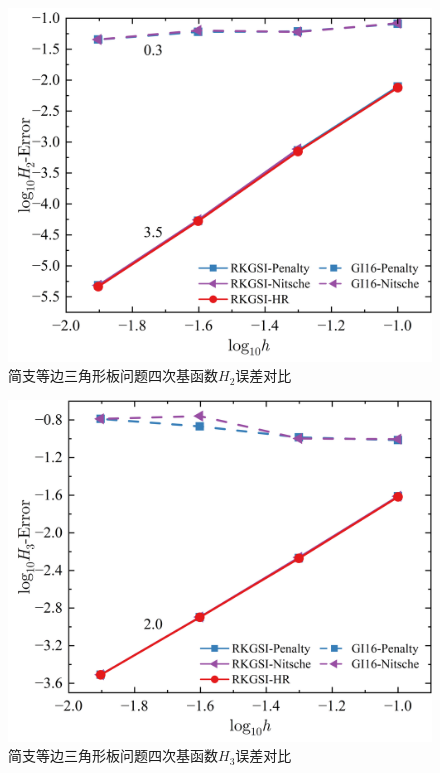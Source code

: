 \begin{figure}[H]
    \centering
    \includegraphics[scale=0.5]{figure/PHR/T/QH2.png}
    \caption{简支等边三角形板问题四次基函数$H_2$误差对比}
\end{figure}
\newpage
\begin{figure}[H]
    \centering
    \includegraphics[scale=0.5]{figure/PHR/T/QH3.png}
    \caption{简支等边三角形板问题四次基函数$H_3$误差对比}\label{TQLH}
\end{figure}
